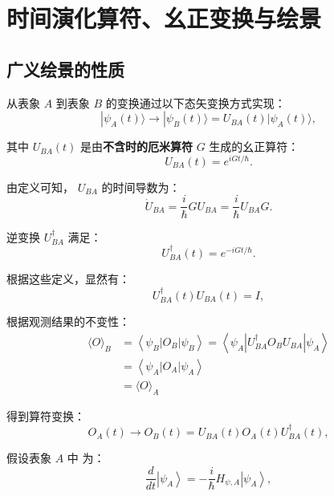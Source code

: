 \section{时间演化算符、幺正变换与绘景}
\subsection{广义绘景的性质}
从表象 $ A $ 到表象 $ B $ 的变换通过以下态矢变换方式实现：
\begin{equation}
	|\psi_A(t)\rangle \to |\psi_B(t)\rangle = U_{BA}(t) |\psi_A(t)\rangle,\label{18}
\end{equation}

其中 $ U_{BA}(t) $ 是由\textbf{不含时的厄米算符} $ G $ 生成的幺正算符：
\begin{equation}
	U_{BA}(t) = e^{i G t / \hbar}.
\end{equation}

由定义可知， $ U_{BA} $ 的时间导数为：
\begin{equation}
	\dot{U}_{BA} = \frac{i}{\hbar} G U_{BA} = \frac{i}{\hbar} U_{BA} G.
\end{equation}

逆变换 $ U_{BA}^\dagger $ 满足：
\begin{equation}
	U_{BA}^\dagger(t) = e^{-i G t / \hbar}.
\end{equation}

根据这些定义，显然有：
\begin{equation}
	U_{BA}^\dagger(t) U_{BA}(t) = I,
\end{equation}

根据观测结果的不变性：
\begin{equation}
	\begin{aligned}
		\langle O \rangle_B &= \left\langle \psi_B \left| O_B \right| \psi_B \right\rangle = \left\langle \psi_A \left| U_{BA}^\dagger  O_B  U_{BA} \right| \psi_A \right\rangle \\
		&= \left\langle \psi_A \left| O_A \right| \psi_A \right\rangle \\
		&= \langle O \rangle_A
	\end{aligned}
\end{equation}

得到算符变换：
\begin{equation}
	O_A(t) \to O_B(t) = U_{BA}(t) O_A(t) U_{BA}^\dagger(t),\label{19}
\end{equation}

假设表象 $ A $ 中  为：
\begin{equation}
	\frac{d}{dt} \left|\psi_A\right\rangle = -\frac{i}{\hbar} H_{\psi,A} \left|\psi_A\right\rangle,
\end{equation}

